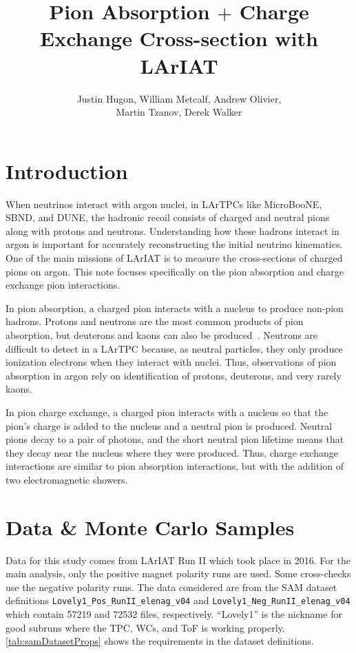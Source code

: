 \documentclass[letterpaper,12pt]{article}
\title{Pion Absorption $+$ Charge Exchange Cross-section with LArIAT}
\author{Justin Hugon, William Metcalf, Andrew Olivier,\\Martin Tzanov, Derek Walker}
\begin{document}
\maketitle

\section{Introduction}

When neutrinos interact with argon nuclei, in LArTPCs like MicroBooNE, SBND,
and DUNE, the hadronic recoil consists of charged and neutral pions along with
protons and neutrons. Understanding how these hadrons interact in argon is
important for accurately reconstructing the initial neutrino kinematics.  One
of the main missions of LArIAT is to measure the cross-sections of charged
pions on argon. This note focuses specifically on the pion absorption and
charge exchange pion interactions.

In pion absorption, a charged pion interacts with a nucleus to produce non-pion
hadrons. Protons and neutrons are the most common products of pion absorption,
but deuterons and kaons can also be
produced~\cite{Kotlinski:1998vh,Rowntree:1999dp,Kotlinski:2000hp,Androic:2001tq}.
Neutrons are difficult to detect in a LArTPC because, as neutral particles,
they only produce ionization electrons when they interact with nuclei. Thus,
observations of pion absorption in argon rely on identification of protons,
deuterons, and very rarely kaons.

In pion charge exchange, a charged pion interacts with a nucleus so that the
pion's charge is added to the nucleus and a neutral pion is produced. Neutral
pions decay to a pair of photons, and the short neutral pion lifetime means
that they decay near the nucleus where they were produced. Thus, charge
exchange interactions are similar to pion absorption interactions, but with the
addition of two electromagnetic showers.

\section{Data \& Monte Carlo Samples}

Data for this study comes from LArIAT Run II which took place in 2016. For the
main analysis, only the positive magnet polarity runs are used. Some
cross-checks use the negative polarity runs. The data considered are from the
SAM dataset definitions \texttt{Lovely1\_Pos\_RunII\_elenag\_v04} and
\texttt{Lovely1\_Neg\_RunII\_elenag\_v04} which contain 57219 and 72532 files,
respectively. ``Lovely1'' is the nickname for good subruns where the TPC, WCs,
and ToF is working properly. \cref{tab:samDatasetProps} shows the requirements
in the dataset definitions.
\end{document}
